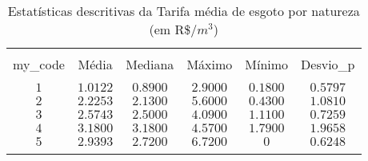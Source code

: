 
\begin{table}[H] \centering 
	\begin{minipage}{0.7\textwidth}
  \caption{Estatísticas descritivas da Tarifa média de esgoto por natureza (em R\$/$m^{3}$)} 
  \label{tab:in006} 
\begin{tabular}{@{\extracolsep{5pt}} cccccc} 
\\[-1.8ex]\hline 
\hline \\[-1.8ex] 
my\_code & Média & Mediana & Máximo & Mínimo & Desvio\_p \\ 
\hline \\[-1.8ex] 
$1$ & $1.0122$ & $0.8900$ & $2.9000$ & $0.1800$ & $0.5797$ \\ 
$2$ & $2.2253$ & $2.1300$ & $5.6000$ & $0.4300$ & $1.0810$ \\ 
$3$ & $2.5743$ & $2.5000$ & $4.0900$ & $1.1100$ & $0.7259$ \\ 
$4$ & $3.1800$ & $3.1800$ & $4.5700$ & $1.7900$ & $1.9658$ \\ 
$5$ & $2.9393$ & $2.7200$ & $6.7200$ & $0$ & $0.6248$ \\ 
\hline \\[-1.8ex] 
\end{tabular} 
	\end{minipage}
\end{table} 